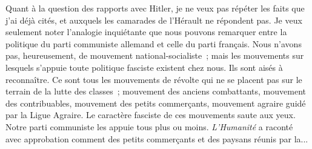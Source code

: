 \documentclass[french,twoside]{book} %
\begin{document}
Quant à la question des rapports avec Hitler, je ne veux pas répéter les faits que j'ai déjà cités, et auxquels les camarades de l'Hérault ne répondent pas. Je veux seulement noter l'analogie inquiétante que nous pouvons remar­quer entre la politique du parti communiste allemand et celle du parti français. Nous n'avons pas, heureusement, de mouvement national-socialiste ; mais les mouvements sur lesquels s'appuie toute politique fasciste existent chez nous. Ils sont aisés à reconnaître. Ce sont tous les mouvements de révolte qui ne se placent pas sur le terrain de la lutte des classes ; mouvement des anciens combattants, mouvement des contribuables, mouvement des petits commer­çants, mouvement agraire guidé par la Ligue Agraire. Le caractère fasciste de ces mouvements saute aux yeux. Notre parti communiste les appuie tous plus ou moins. {\itshape L'Humanité} a raconté avec approbation comment des petits commerçants et des paysans réunis par la...
\end{document}
